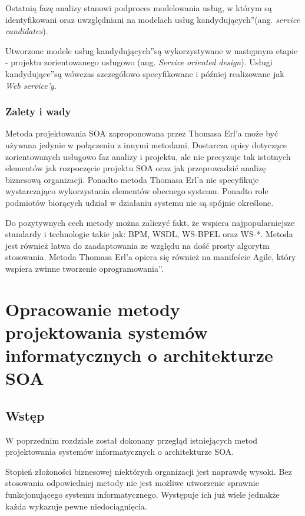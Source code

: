 Ostatnią fazę analizy stanowi podproces modelowania usług, w którym są identyfikowani oraz uwzględniani na modelach \quotedblbase usług kandydujących\textquotedblright (ang. \emph{service candidates}). \cite{CompSOAMet}

Utworzone modele \quotedblbase usług kandydujących\textquotedblright są wykorzystywane w następnym etapie - projektu zorientowanego usługowo (ang. \emph{Service oriented design}). \quotedblbase Usługi kandydujące\textquotedblright są wówczas szczegółowo specyfikowane i później realizowane jak \emph{Web service'y}.


\subsection{Zalety i wady}
Metoda projektowania SOA zaproponowana przez Thomasa Erl'a może być używana jedynie w połączeniu z innymi metodami. Dostarcza opisy dotyczące zorientowanych usługowo faz analizy i projektu, ale nie precyzuje tak istotnych elementów jak rozpoczęcie projektu SOA oraz jak przeprowadzić analizę biznesową organizacji. Ponadto metoda Thomasa Erl'a nie specyfikuje wystarczająco wykorzystania elementów obecnego systemu. Ponadto role podmiotów biorących udział w działaniu systemu nie są spójnie określone.

Do pozytywnych cech metody można zaliczyć fakt, że wspiera najpopularniejsze standardy i technologie takie jak: BPM, WSDL, WS-BPEL oraz WS-*. Metoda jest również łatwa do zaadaptowania ze względu na dość prosty algorytm stosowania. Metoda Thomasa Erl'a opiera się również na manifeście Agile, który wspiera \quotedblbase zwinne tworzenie oprogramowania\textquotedblright. \cite{OffCompSOAM, RamErvSOA}

\chapter{Opracowanie metody projektowania systemów informatycznych o architekturze SOA}
\section{Wstęp}
W poprzednim rozdziale został dokonany przegląd istniejących metod projektowania systemów informatycznych o architekturze SOA.

Stopień złożoności biznesowej niektórych organizacji jest naprawdę wysoki. Bez stosowania odpowiedniej metody nie jest możliwe utworzenie sprawnie funkcjonującego systemu informatycznego. Występuje ich już wiele jednakże każda wykazuje pewne niedociągnięcia.

